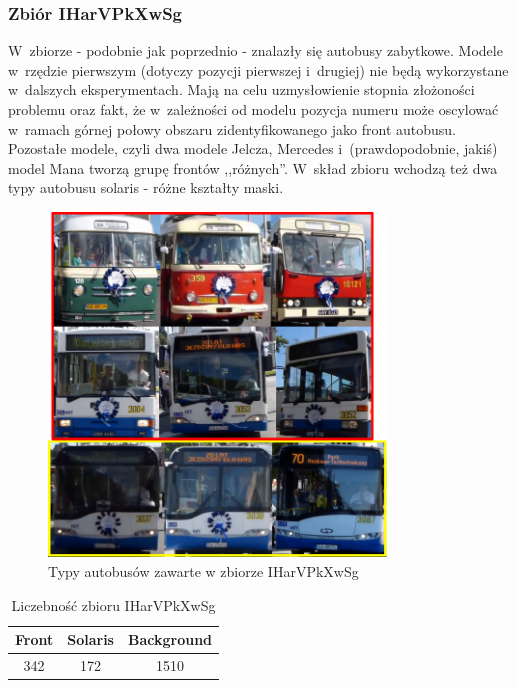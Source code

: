 \newpage

\subsubsection{Zbiór IHarVPkXwSg}

W~zbiorze - podobnie jak poprzednio - znalazły się autobusy zabytkowe.
Modele w~rzędzie pierwszym (dotyczy pozycji pierwszej i~drugiej) nie 
będą wykorzystane w~dalszych eksperymentach. Mają na celu uzmysłowienie
stopnia złożoności problemu oraz fakt, że w~zależności od modelu pozycja
numeru może oscylować w~ramach górnej połowy obszaru zidentyfikowanego
jako front autobusu. Pozostałe modele, czyli
dwa modele Jelcza, Mercedes i~(prawdopodobnie, jakiś) model Mana tworzą
grupę frontów ,,różnych''. W~skład zbioru wchodzą też dwa typy autobusu
solaris - różne kształty maski.

\begin{figure}[!h]
    \centering
    \includegraphics[width=0.8\textwidth]{img/exp_trainig_data_IHa}
    \caption{Typy autobusów zawarte w zbiorze IHarVPkXwSg}
    \label{fig:IHarVPkXwSg_types}
\end{figure}

\begin{table}[!h]
    \centering
    \begin{tabular}{c|c|c}
        Front   & Solaris   & Background \\ \hline
        342     & 172       & 1510
    \end{tabular}
    \caption{Liczebność zbioru IHarVPkXwSg}
    \label{tab:IHarVPkXwSg_count}
\end{table}

